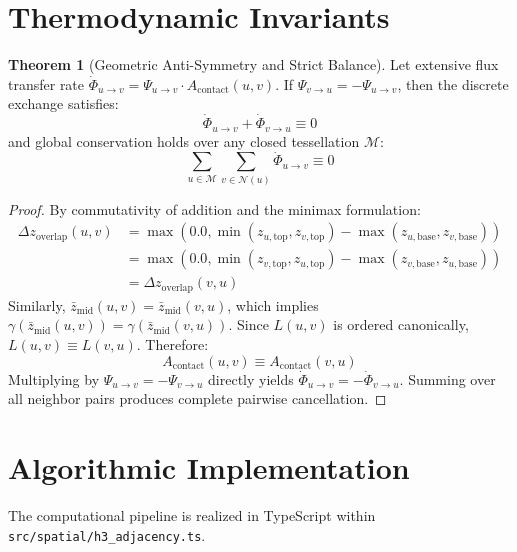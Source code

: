\documentclass[11pt,a4paper]{article}
\theoremstyle{definition}
\newtheorem{theorem}{Theorem}
\begin{document}
\section{Thermodynamic Invariants}

\begin{theorem}[Geometric Anti-Symmetry and Strict Balance]
Let extensive flux transfer rate $\dot{\Phi}_{u \to v} = \Psi_{u \to v} \cdot A_{\text{contact}}(u, v)$. If $\Psi_{v \to u} = -\Psi_{u \to v}$, then the discrete exchange satisfies:
\begin{equation}
\dot{\Phi}_{u \to v} + \dot{\Phi}_{v \to u} \equiv 0
\end{equation}
and global conservation holds over any closed tessellation $\mathcal{M}$:
\begin{equation}
\sum_{u \in \mathcal{M}} \sum_{v \in \mathcal{N}(u)} \dot{\Phi}_{u \to v} \equiv 0
\end{equation}
\end{theorem}

\begin{proof}
By commutativity of addition and the minimax formulation:
\begin{align*}
\Delta z_{\text{overlap}}(u, v) &= \max\left(0.0, \min(z_{u,\text{top}}, z_{v,\text{top}}) - \max(z_{u,\text{base}}, z_{v,\text{base}})\right) \\
&= \max\left(0.0, \min(z_{v,\text{top}}, z_{u,\text{top}}) - \max(z_{v,\text{base}}, z_{u,\text{base}})\right) \\
&= \Delta z_{\text{overlap}}(v, u)
\end{align*}
Similarly, $\bar{z}_{\text{mid}}(u, v) = \bar{z}_{\text{mid}}(v, u)$, which implies $\gamma(\bar{z}_{\text{mid}}(u, v)) = \gamma(\bar{z}_{\text{mid}}(v, u))$. Since $L(u, v)$ is ordered canonically, $L(u, v) \equiv L(v, u)$. Therefore:
\begin{equation}
A_{\text{contact}}(u, v) \equiv A_{\text{contact}}(v, u)
\end{equation}
Multiplying by $\Psi_{u \to v} = -\Psi_{v \to u}$ directly yields $\dot{\Phi}_{u \to v} = -\dot{\Phi}_{v \to u}$. Summing over all neighbor pairs produces complete pairwise cancellation.
\end{proof}

\section{Algorithmic Implementation}

The computational pipeline is realized in TypeScript within \texttt{src/spatial/h3\_adjacency.ts}.
\end{document}

